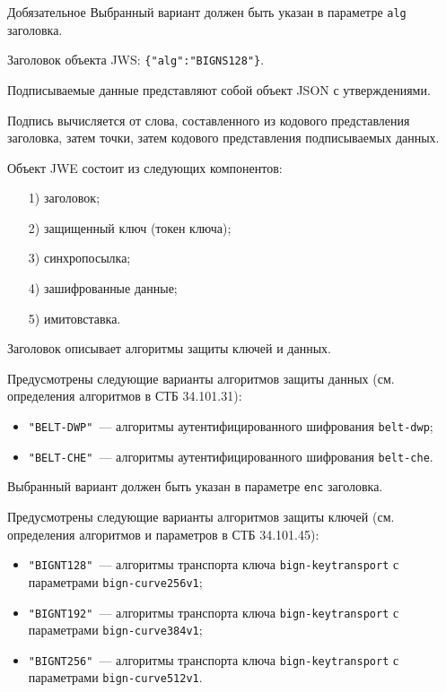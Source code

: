 \begin{appendix}{Д}{обязательное}{}
Выбранный вариант должен быть указан в параметре \lstinline{alg} заголовка.

\begin{example*}
Заголовок объекта JWS: \lstinline|{"alg":"BIGNS128"}|.
\end{example*}

Подписываемые данные представляют собой объект JSON с утверждениями. 

Подпись вычисляется от слова, составленного из кодового представления 
заголовка, затем точки, затем кодового представления подписываемых данных. 


Объект JWE состоит из следующих компонентов:
\begin{enumerate}
\item[1)] 
заголовок;
\item[2)] 
защищенный ключ (токен ключа);
\item[3)] 
синхропосылка;
\item[4)]
зашифрованные данные;
\item[5)]
имитовставка.
\end{enumerate}

Заголовок описывает алгоритмы защиты ключей и данных.

Предусмотрены следующие варианты алгоритмов защиты данных
(см. определения алгоритмов в СТБ 34.101.31):
\begin{itemize}
\item
\lstinline{"BELT-DWP"}~--- алгоритмы аутентифицированного шифрования 
\lstinline{belt-dwp}; 
\item
\lstinline{"BELT-CHE"}~--- алгоритмы аутентифицированного шифрования 
\lstinline{belt-che}.
\end{itemize}

Выбранный вариант должен быть указан в параметре \lstinline{enc} заголовка.

Предусмотрены следующие варианты алгоритмов защиты ключей
(см. определения алгоритмов и параметров в СТБ 34.101.45):
\begin{itemize}
\item
\lstinline{"BIGNT128"}~--- алгоритмы транспорта ключа 
\lstinline{bign-keytransport} с параметрами \lstinline{bign-curve256v1};
\item
\lstinline{"BIGNT192"}~--- алгоритмы транспорта ключа 
\lstinline{bign-keytransport} с параметрами \lstinline{bign-curve384v1};
\item
\lstinline{"BIGNT256"}~--- алгоритмы транспорта ключа 
\lstinline{bign-keytransport} с параметрами \lstinline{bign-curve512v1}. 
\end{itemize}


\end{appendix}
